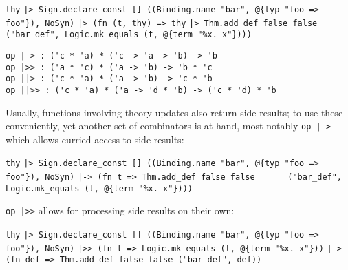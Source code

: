 \begin{isabellebody}
\begin{isamarkuptext}
  \smallskip\begin{mldecls}
\verb|thy|\isasep\isanewline%
\verb||\verb,|,\verb|> Sign.declare_const [] ((Binding.name "bar", @{typ "foo => foo"}), NoSyn)|\isasep\isanewline%
\verb||\verb,|,\verb|> (fn (t, thy) => thy|\isasep\isanewline%
\verb||\verb,|,\verb|> Thm.add_def false false|\isasep\isanewline%
\verb|     ("bar_def", Logic.mk_equals (t, @{term "%x. x"})))|
  \end{mldecls}%
\end{isamarkuptext}%
\isamarkuptrue%
%
\isadelimmlref
%
\endisadelimmlref
%
\isatagmlref
%
\begin{isamarkuptext}%
\begin{mldecls}
  \verb|op |\verb,|,\verb|-> : ('c * 'a) * ('c -> 'a -> 'b) -> 'b| \\
  \verb|op |\verb,|,\verb|>> : ('a * 'c) * ('a -> 'b) -> 'b * 'c| \\
  \verb|op |\verb,|,\verb||\verb,|,\verb|> : ('c * 'a) * ('a -> 'b) -> 'c * 'b| \\
  \verb|op |\verb,|,\verb||\verb,|,\verb|>> : ('c * 'a) * ('a -> 'd * 'b) -> ('c * 'd) * 'b| \\
  \end{mldecls}%
\end{isamarkuptext}%
\isamarkuptrue%
%
\endisatagmlref
{\isafoldmlref}%
%
\isadelimmlref
%
\endisadelimmlref
%
\begin{isamarkuptext}%
\noindent Usually, functions involving theory updates also return
  side results; to use these conveniently, yet another
  set of combinators is at hand, most notably \verb|op |\verb,|,\verb|->|
  which allows curried access to side results:

  \smallskip\begin{mldecls}
\verb|thy|\isasep\isanewline%
\verb||\verb,|,\verb|> Sign.declare_const [] ((Binding.name "bar", @{typ "foo => foo"}), NoSyn)|\isasep\isanewline%
\verb||\verb,|,\verb|-> (fn t => Thm.add_def false false|\isasep\isanewline%
\verb|      ("bar_def", Logic.mk_equals (t, @{term "%x. x"})))|\isasep\isanewline%

  \end{mldecls}

  \noindent \verb|op |\verb,|,\verb|>>| allows for processing side results on their own:

  \smallskip\begin{mldecls}
\verb|thy|\isasep\isanewline%
\verb||\verb,|,\verb|> Sign.declare_const [] ((Binding.name "bar", @{typ "foo => foo"}), NoSyn)|\isasep\isanewline%
\verb||\verb,|,\verb|>> (fn t => Logic.mk_equals (t, @{term "%x. x"}))|\isasep\isanewline%
\verb||\verb,|,\verb|-> (fn def => Thm.add_def false false ("bar_def", def))|\isasep\isanewline%


\end{mldecls}
\end{isamarkuptext}
\end{isabellebody}
